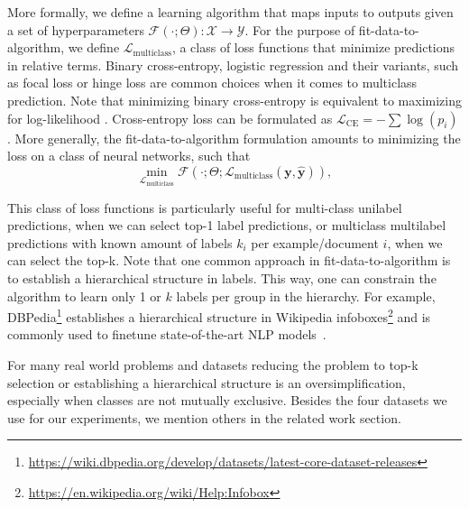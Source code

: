 More formally, we define a learning algorithm that maps inputs to outputs given a set of hyperparameters \(\mathcal{F}(\cdot ; \Theta): \mathcal{X} \rightarrow \mathcal{Y}\). For the purpose of fit-data-to-algorithm,
we define \(\mathcal{L}_{\text {multiclass}}\), a class of loss functions that
minimize predictions in relative terms. Binary cross-entropy, logistic regression and their
variants, such as focal loss or hinge loss are common choices when it comes to
multiclass prediction. Note that minimizing binary cross-entropy is equivalent to maximizing for log-likelihood
\cite[Section 4.3.4]{Bishop}.
Cross-entropy loss can be formulated as
\(\mathcal{L}_{\text {CE}}=-\sum \log \left(p_{i}\right)\).
More generally, the fit-data-to-algorithm formulation amounts to minimizing the loss on a class of neural networks, such that
%
\begin{equation}
\underset{\mathcal{L}_{\text {multiclass}}} {\min} \mathcal{F}\left(\cdot ;
\Theta; \mathcal{L}_{\text {multiclass}} (\mathbf{y}, \hat{\mathbf{y}})
\right),
\end{equation}
%

This class of loss functions is particularly useful for multi-class unilabel predictions, when we can select top-1 label predictions, or multiclass multilabel predictions with known amount of labels $k_i$ per example/document $i$, when we can select the top-k. Note that one common approach in fit-data-to-algorithm is to establish a hierarchical structure in labels. This way, one can constrain the algorithm to learn only 1 or $k$ labels per group in the hierarchy. For example, DBPedia\footnote{\url{https://wiki.dbpedia.org/develop/datasets/latest-core-dataset-releases} } establishes a hierarchical structure in Wikipedia infoboxes\footnote{\url{https://en.wikipedia.org/wiki/Help:Infobox} } and is commonly used to finetune state-of-the-art NLP models~\citep[see, e.g.,][]{XLNet, ULMFit}.

For many real world problems and datasets reducing the problem to top-k selection or establishing a hierarchical structure is an oversimplification, especially when classes are not mutually exclusive. Besides the four datasets we use for our experiments, we mention others in the related work section.

